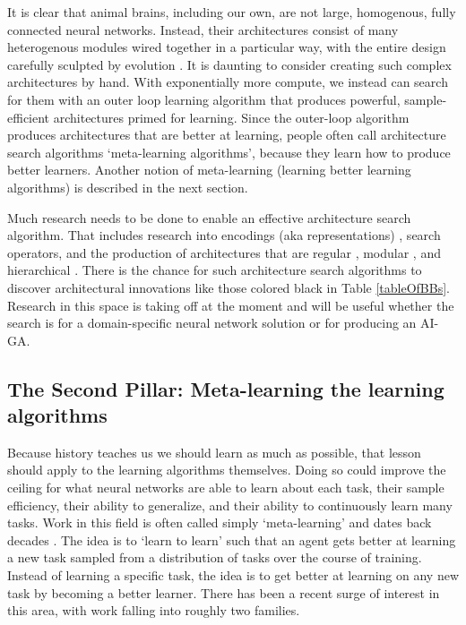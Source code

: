 \documentclass{article}
\begin{document}
It is clear that animal brains, including our own, are not large, homogenous, fully connected neural networks. Instead, their architectures consist of many heterogenous modules wired together in a particular way, with the entire design carefully sculpted by evolution \cite{striedter2005principles}. It is daunting to consider creating such complex architectures by hand. With exponentially more compute, we instead can search for them with an outer loop learning algorithm that produces powerful, sample-efficient architectures primed for learning. Since the outer-loop algorithm produces architectures that are better at learning, people often call architecture search algorithms `meta-learning algorithms', because they learn how to produce better learners. Another notion of meta-learning (learning better learning algorithms) is described in the next section. 

Much research needs to be done to enable an effective architecture search algorithm. That includes research into encodings (aka representations) \cite{stanley2007compositional,stanley2009hypercube,stanley2003taxonomy,zoph2016neural,gruau1994automatic}, search operators, and the production of architectures that are regular \cite{stanley2009hypercube, clune2011performance,huizinga2014evolving}, modular \cite{clune2013originModularity, huizinga2014evolving}, and hierarchical \cite{mengistu2016evolutionary}. There is the chance for such architecture search algorithms to discover architectural innovations like those colored black in Table \ref{tableOfBBs}. Research in this space is taking off at the moment and will be useful whether the search is for a domain-specific neural network solution or for producing an AI-GA. 

\subsection{The Second Pillar: Meta-learning the learning algorithms}
\label{Pillar2-learningAlgos}

Because history teaches us we should learn as much as possible, that lesson should apply to the learning algorithms themselves. Doing so could improve the ceiling for what neural networks are able to learn about each task, their sample efficiency, their ability to generalize, and their ability to continuously learn many tasks. Work in this field is often called simply `meta-learning' and dates back decades \cite{hochreiter2001learning,cotter1990fixed,soltoggio2018born,schmidhuber1987evolutionary,ellefsen2015neural, velez2017diffusion,finn2017model,wang2016learning,duan2016rl,schmidhuber2015deep,andrychowicz2016learning,ravi2016optimization,li2016learning}. The idea is to `learn to learn' such that an agent gets better at learning a new task sampled from a distribution of tasks over the course of training. Instead of learning a specific task, the idea is to get better at learning on any new task by becoming a better learner. There has been a recent surge of interest in this area, with work falling into roughly two families. 
\end{document}
